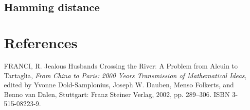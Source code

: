 \documentclass{article}
\begin{document}
\subsection{Hamming distance}


\section{References}

FRANCI, R. Jealous Husbands Crossing the River: A Problem from Alcuin to Tartaglia, \textit{From China to Paris: 2000 Years Transmission of Mathematical Ideas}, edited by Yvonne Dold-Samplonius, Joseph W. Dauben, Menso Folkerts, and Benno van Dalen, Stuttgart: Franz Steiner Verlag, 2002, pp. 289–306. ISBN 3-515-08223-9.
\end{document}
